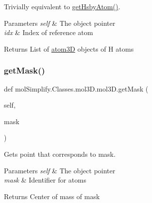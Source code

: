 Trivially equivalent to \hyperlink{classmolSimplify_1_1Classes_1_1mol3D_1_1mol3D_a232adbbe11745aac4561a15fe1850df4}{get\+Hsby\+Atom()}. 
\begin{DoxyParams}{Parameters}
{\em self} & The object pointer \\
\hline
{\em idx} & Index of reference atom \\
\hline
\end{DoxyParams}
\begin{DoxyReturn}{Returns}
List of \hyperlink{namespacemolSimplify_1_1Classes_1_1atom3D}{atom3D} objects of H atoms 
\end{DoxyReturn}
\mbox{\label{classmolSimplify_1_1Classes_1_1mol3D_1_1mol3D_aae3d38b16c8876fd11e6a170b3e18df0}} 
\subsubsection{\texorpdfstring{get\+Mask()}{getMask()}}
{\footnotesize\ttfamily def mol\+Simplify.\+Classes.\+mol3\+D.\+mol3\+D.\+get\+Mask (\begin{DoxyParamCaption}\item[{}]{self,  }\item[{}]{mask }\end{DoxyParamCaption})}



Gets point that corresponds to mask. 


\begin{DoxyParams}{Parameters}
{\em self} & The object pointer \\
\hline
{\em mask} & Identifier for atoms \\
\hline
\end{DoxyParams}
\begin{DoxyReturn}{Returns}
Center of mass of mask 
\end{DoxyReturn}
\mbox{\label{classmolSimplify_1_1Classes_1_1mol3D_1_1mol3D_a4a723fdb1daadc53a524243198fb15cb}} 
